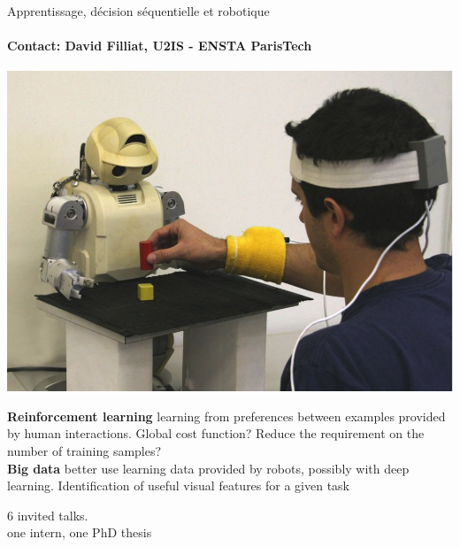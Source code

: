 \begin{frame}{Apprentissage, décision séquentielle et robotique }
\framesubtitle{Contact: David Filliat, U2IS - ENSTA ParisTech}


\begin{minipage}[c]{.4\linewidth}
      \includegraphics[width=\linewidth]{Images/robotique2.png}
   \end{minipage} \hfill
   \begin{minipage}[c]{.55\linewidth}
\textbf{Reinforcement learning} learning from preferences between examples provided by human interactions. Global cost function? Reduce the requirement on the number of training samples? \\
\textbf{Big data} better use learning data provided by robots, possibly with deep learning. Identification of useful visual features for a given task
   \end{minipage}
\begin{center}
6 invited talks.\\
one intern, one PhD thesis
\end{center}

\end{frame}

